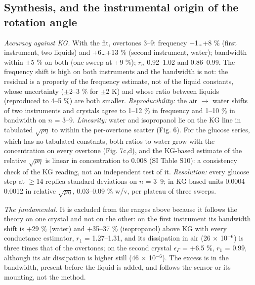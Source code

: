 \documentclass[11pt,a4paper]{article}
\begin{document}
\subsection{Synthesis, and the instrumental origin of the rotation angle}

\emph{Accuracy against KG.} With the fit, overtones 3--9: frequency $-$1\ldots{}+8 \% (first instrument, two liquids) and +6\ldots{}+13 \% (second instrument, water); bandwidth within $\pm$5 \% on both (one sweep at +9 \%); $r_n$ 0.92--1.02 and 0.86--0.99. The frequency shift is high on both instruments and the bandwidth is not: the residual is a property of the frequency estimate, not of the liquid constants, whose uncertainty ($\pm$2--3 \% for $\pm$2 K) and whose ratio between liquids (reproduced to 4--5 \%) are both smaller. \emph{Reproducibility:} the air $\rightarrow$ water shifts of two instruments and crystals agree to 1--12 \% in frequency and 1--10 \% in bandwidth on $n$ = 3--9. \emph{Linearity:} water and isopropanol lie on the KG line in tabulated $\sqrt{\rho\eta}$ to within the per-overtone scatter (Fig. 6). For the glucose series, which has no tabulated constants, both ratios to water grow with the concentration on every overtone (Fig. 7c,d), and the KG-based estimate of the relative $\sqrt{\rho\eta}$ is linear in concentration to 0.008 (SI Table S10): a consistency check of the KG reading, not an independent test of it. \emph{Resolution:} every glucose step at $\ge$14 replica standard deviations on $n$ = 3--9; in KG-based units 0.0004--0.0012 in relative $\sqrt{\rho\eta}$, 0.03--0.09 \% w/v, per plateau of three sweeps.

\emph{The fundamental.} It is excluded from the ranges above because it follows the theory on one crystal and not on the other: on the first instrument its bandwidth shift is +29 \% (water) and +35--37 \% (isopropanol) above KG with every conductance estimator, $r_1$ = 1.27--1.31, and its dissipation in air (26 $\times$ 10$^{-6}$) is three times that of the overtones; on the second crystal $\epsilon_\Gamma$ = +6.5 \%, $r_1$ = 0.99, although its air dissipation is higher still (46 $\times$ 10$^{-6}$). The excess is in the bandwidth, present before the liquid is added, and follows the sensor or its mounting, not the method.
\end{document}
